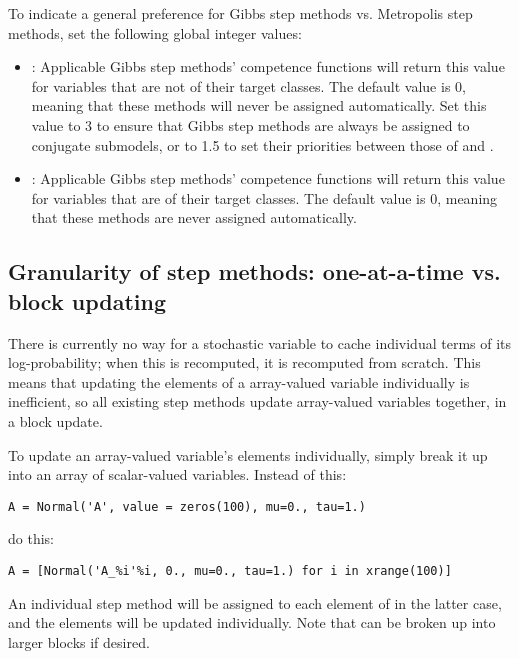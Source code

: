 To indicate a general preference for Gibbs step methods vs. Metropolis step methods, set the following global integer values:
\begin{itemize}
    \item {}: Applicable Gibbs step methods' competence functions will return this value for variables that are not of their target classes. The default value is 0, meaning that these methods will never be assigned automatically. Set this value to 3 to ensure that Gibbs step methods are always be assigned to conjugate submodels, or to 1.5 to set their priorities between those of  and .
    \item {}: Applicable Gibbs step methods' competence functions will return this value for variables that are of their target classes. The default value is 0, meaning that these methods are never assigned automatically.
\end{itemize}


\subsection*{Granularity of step methods: one-at-a-time vs. block updating} 
There is currently no way for a stochastic variable to cache individual terms of its log-probability; when this is recomputed, it is recomputed from scratch. This means that updating the elements of a array-valued variable individually is inefficient, so all existing step methods update array-valued variables together, in a block update.

To update an array-valued variable's elements individually, simply break it up into an array of scalar-valued variables. Instead of this:
\begin{verbatim}
A = Normal('A', value = zeros(100), mu=0., tau=1.)    
\end{verbatim}
do this:
\begin{verbatim}
A = [Normal('A_%i'%i, 0., mu=0., tau=1.) for i in xrange(100)]
\end{verbatim}
An individual step method will be assigned to each element of  in the latter case, and the elements will be updated individually. Note that  can be broken up into larger blocks if desired.

